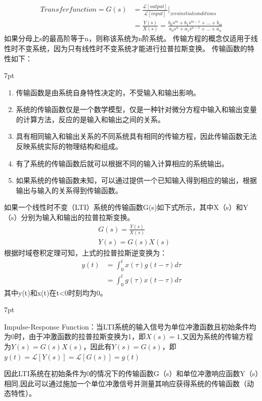 \documentclass{article}
\numberwithin{equation}{section}
\numberwithin{figure}{section}
\newenvironment{formal}{%
\def\FrameCommand{%
\hspace{1pt}%
{\color{DarkBlue}\vrule width 2pt}%
{\color{formalshade}\vrule width 4pt}%
\colorbox{formalshade}%
}%
\MakeFramed{\advance\hsize-\width\FrameRestore}%
\noindent\hspace{-4.55pt}%
\begin{adjustwidth}{}{7pt}%
\vspace{2pt}\vspace{2pt}%
}
{%
\vspace{2pt}\end{adjustwidth}\endMakeFramed%
}
\begin{document}
\begin{equation}
    \begin{split}
Transfer function = G(s) &= \frac{\mathscr{L}[output]}{\mathscr{L}[input]}|_{zero initial conditions} \\
&= \frac{Y(s)}{X(s)} = \frac{b_0s^m+b_1s^{m-1}+...+b_m}{a_0s^n+a_1s^{n-1}+...+a_n}
    \end{split}
\end{equation}
如果分母上s的最高阶等于n，则称该系统为n阶系统。
传输方程的概念仅适用于线性时不变系统，因为只有线性时不变系统才能进行拉普拉斯变换。
传输函数的特性如下：
\begin{formal}
    \begin{enumerate}
    \item 传输函数是由系统自身特性决定的，不受输入和输出影响。
    \item 系统的传输函数仅是一个数学模型，仅是一种针对微分方程中输入和输出变量的计算方法，反应的是输入和输出之间的关系。
    \item 具有相同输入和输出关系的不同系统具有相同的传输方程，因此传输函数无法反映系统实际的物理结构和组成。
    \item 有了系统的传输函数后就可以根据不同的输入计算相应的系统输出。
    \item 如果系统的传输函数未知，可以通过提供一个已知输入得到相应的输出，根据输出与输入的关系得到传输函数。
    \end{enumerate}
\end{formal}
如果一个线性时不变（LTI）系统的传输函数G(s)如下式所示，其中X（s）和Y（s）分别为输入和输出的拉普拉斯变换。
\begin{equation}
    \begin{split}
        &G(s)=\frac{Y(s)}{X(s)}\\
        &Y(s)=G(s)X(s)
    \end{split}
\end{equation}
根据时域卷积定理可知，上式的拉普拉斯逆变换为：
\begin{equation}
    \begin{split}
        y(t)&=\int_{0}^{t}x(\tau)g(t-\tau)d{\tau}\\
        &=\int_{0}^{t}g(\tau)x(t-\tau)d{\tau}
    \end{split}
\end{equation}
其中y(t)和x(t)在t<0时刻均为0。
\begin{formal}
    Impulse-Response Function：当LTI系统的输入信号为单位冲激函数且初始条件均为0时，由于冲激函数的拉普拉斯变换为1，即$X(s)=1$,又因为系统的传输方程为$Y(s)=G(s)X(s)$，因此有$Y(s)=G(s)$，即$y(t)=\mathscr{L}[Y(s)]=\mathscr{L}[G(s)]=g(t)$
\end{formal}
因此LTI系统在初始条件为0的情况下的传输函数G（s）和单位冲激响应函数Y（s）相同,因此可以通过施加一个单位冲激信号并测量其响应获得系统的传输函数（动态特性）。
\end{document}
